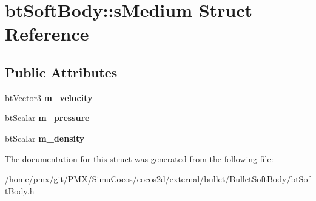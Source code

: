 \hypertarget{structbtSoftBody_1_1sMedium}{}\section{bt\+Soft\+Body\+:\+:s\+Medium Struct Reference}
\label{structbtSoftBody_1_1sMedium}
\subsection*{Public Attributes}
\begin{DoxyCompactItemize}
\item 
\mbox{\label{structbtSoftBody_1_1sMedium_affbc228a8ce2083a0737bf638a0532bb}} 
bt\+Vector3 {\bfseries m\+\_\+velocity}
\item 
\mbox{\label{structbtSoftBody_1_1sMedium_ae6862f2817ec4fb032f824c6a1c169bd}} 
bt\+Scalar {\bfseries m\+\_\+pressure}
\item 
\mbox{\label{structbtSoftBody_1_1sMedium_a733bce7e2535dc75c72e31f2ed865647}} 
bt\+Scalar {\bfseries m\+\_\+density}
\end{DoxyCompactItemize}


The documentation for this struct was generated from the following file\+:\begin{DoxyCompactItemize}
\item 
/home/pmx/git/\+P\+M\+X/\+Simu\+Cocos/cocos2d/external/bullet/\+Bullet\+Soft\+Body/bt\+Soft\+Body.\+h\end{DoxyCompactItemize}
